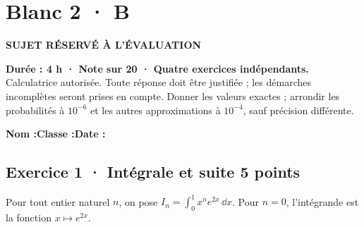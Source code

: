 \fi

\fi

\ifprof

\clearpage{}\label{sujet:8-4}

\section*{Blanc 2 · B}

{\sffamily\bfseries\color{amber}SUJET RÉSERVÉ À L'ÉVALUATION\par}

\textbf{Durée : 4 h · Note sur 20 · Quatre exercices indépendants.}\\Calculatrice autorisée. Toute réponse doit être justifiée ; les démarches incomplètes seront prises en compte. Donner les valeurs exactes ; arrondir les probabilités à $10^{-6}$ et les autres approximations à $10^{-4}$, sauf précision différente.

\smallskip\textbf{Nom :}\enspace\dotfill\quad\textbf{Classe :}\enspace\dotfill\quad\textbf{Date :}\enspace\dotfill

\subsection*{Exercice 1 · Intégrale et suite \hfill 5 points}Pour tout entier naturel $n$, on pose $I_n=\displaystyle\int_0^1x^ne^{2x}\,\dd x$. Pour $n=0$, l'intégrande est la fonction $x\mapsto e^{2x}$.


